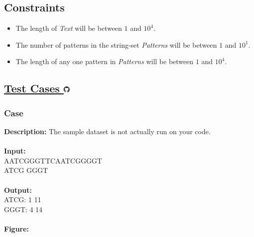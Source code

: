 \documentclass{article}
\newcommand{\code}[1]{{\fontfamily{pcr}\selectfont #1}}
\newcommand{\gitlogo}{\includegraphics[height=12.5]{c0/gitlogo.png}}
\begin{document}
\subsection*{Constraints}

\begin{itemize}
    \item The length of \emph{Text} will be between $1$ and $10^4$.
    \item The number of patterns in the string-set \emph{Patterns} will be between $1$ and $10^1$.
    \item The length of any one pattern in \emph{Patterns} will be between $1$ and $10^4$.
\end{itemize}
\pagebreak

\subsection*{\href{https://github.com/rjeveloff/BA_problemregister/tree/main/test_cases/chapter_9/9B}{Test Cases \gitlogo}}
\subsubsection*{Case }
\hline \vspace{5}
\textbf{Description:} The sample dataset is not actually run on your code.\\ \\
\noindent \textbf{Input:} \\
\code{AATCGGGTTCAATCGGGGT \\
ATCG GGGT \\ \\}
\noindent \textbf{Output:} \\
\code{ATCG: 1 11\\ GGGT: 4 14}\\ \\
\noindent \textbf{Figure:}
\end{document}
